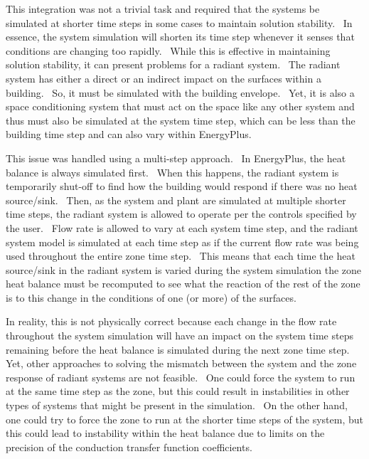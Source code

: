 This integration was not a trivial task and required that the systems be simulated at shorter time steps in some cases to maintain solution stability.~ In essence, the system simulation will shorten its time step whenever it senses that conditions are changing too rapidly.~ While this is effective in maintaining solution stability, it can present problems for a radiant system.~ The radiant system has either a direct or an indirect impact on the surfaces within a building.~ So, it must be simulated with the building envelope.~ Yet, it is also a space conditioning system that must act on the space like any other system and thus must also be simulated at the system time step, which can be less than the building time step and can also vary within EnergyPlus.

This issue was handled using a multi-step approach.~ In EnergyPlus, the heat balance is always simulated first.~ When this happens, the radiant system is temporarily shut-off to find how the building would respond if there was no heat source/sink.~ Then, as the system and plant are simulated at multiple shorter time steps, the radiant system is allowed to operate per the controls specified by the user.~ Flow rate is allowed to vary at each system time step, and the radiant system model is simulated at each time step as if the current flow rate was being used throughout the entire zone time step.~ This means that each time the heat source/sink in the radiant system is varied during the system simulation the zone heat balance must be recomputed to see what the reaction of the rest of the zone is to this change in the conditions of one (or more) of the surfaces.

In reality, this is not physically correct because each change in the flow rate throughout the system simulation will have an impact on the system time steps remaining before the heat balance is simulated during the next zone time step.~ Yet, other approaches to solving the mismatch between the system and the zone response of radiant systems are not feasible.~ One could force the system to run at the same time step as the zone, but this could result in instabilities in other types of systems that might be present in the simulation.~ On the other hand, one could try to force the zone to run at the shorter time steps of the system, but this could lead to instability within the heat balance due to limits on the precision of the conduction transfer function coefficients.

